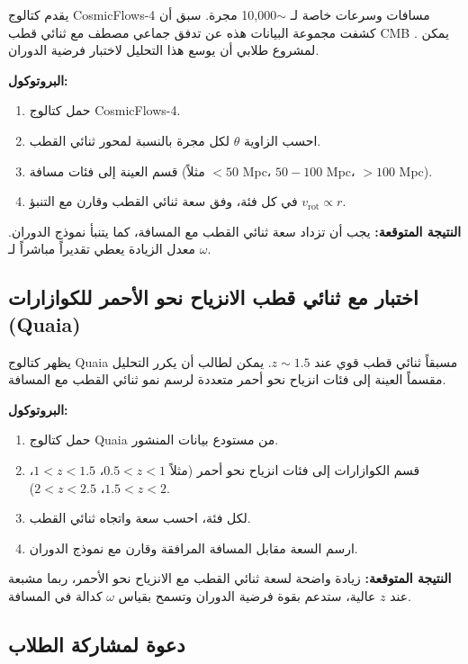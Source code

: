 \documentclass[12pt,a4paper]{article}
\begin{document}
	يقدم كتالوج CosmicFlows-4 مسافات وسرعات خاصة لـ \(\sim\)10,000 مجرة. سبق أن كشفت مجموعة البيانات هذه عن تدفق جماعي مصطف مع ثنائي قطب CMB \cite{Watkins2023}. يمكن لمشروع طلابي أن يوسع هذا التحليل لاختبار فرضية الدوران.
	
	\textbf{البروتوكول:}
	\begin{enumerate}
		\item حمل كتالوج CosmicFlows-4.
		\item احسب الزاوية \(\theta\) لكل مجرة بالنسبة لمحور ثنائي القطب.
		\item قسم العينة إلى فئات مسافة (مثلاً \(<50\) Mpc، \(50-100\) Mpc، \(>100\) Mpc).
		\item في كل فئة، وفق سعة ثنائي القطب وقارن مع التنبؤ \(v_{\mathrm{rot}} \propto r\).
	\end{enumerate}
	
	\textbf{النتيجة المتوقعة:} يجب أن تزداد سعة ثنائي القطب مع المسافة، كما يتنبأ نموذج الدوران. معدل الزيادة يعطي تقديراً مباشراً لـ \(\omega\).
	
	\subsection{اختبار مع ثنائي قطب الانزياح نحو الأحمر للكوازارات (Quaia)}
	
	يظهر كتالوج Quaia \cite{Secrest2025} مسبقاً ثنائي قطب قوي عند \(z\sim1.5\). يمكن لطالب أن يكرر التحليل مقسماً العينة إلى فئات انزياح نحو أحمر متعددة لرسم نمو ثنائي القطب مع المسافة.
	
	\textbf{البروتوكول:}
	\begin{enumerate}
		\item حمل كتالوج Quaia من مستودع بيانات المنشور.
		\item قسم الكوازارات إلى فئات انزياح نحو أحمر (مثلاً \(0.5<z<1\)، \(1<z<1.5\)، \(1.5<z<2\)، \(2<z<2.5\)).
		\item لكل فئة، احسب سعة واتجاه ثنائي القطب.
		\item ارسم السعة مقابل المسافة المرافقة وقارن مع نموذج الدوران.
	\end{enumerate}
	
	\textbf{النتيجة المتوقعة:} زيادة واضحة لسعة ثنائي القطب مع الانزياح نحو الأحمر، ربما مشبعة عند \(z\) عالية، ستدعم بقوة فرضية الدوران وتسمح بقياس \(\omega\) كدالة في المسافة.
	
	\subsection{دعوة لمشاركة الطلاب}
	
\end{document}
